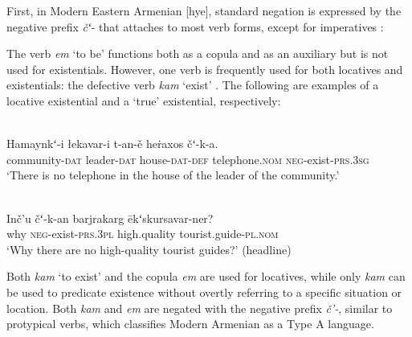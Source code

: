 \documentclass[output=paper,colorlinks,citecolor=brown]{langscibook}
\begin{document}
First, in Modern Eastern Armenian [hye], standard negation is
expressed by the negative prefix \textit{čʻ}- that attaches to most verb
forms, except for imperatives \parencite[522]{DumTragut2009}:
%
    \begin{exe}\end{exe}
%
The verb \textit{em} `to be' functions both as a copula and as an auxiliary
\parencite[215]{DumTragut2009} but is not used for existentials. However,
one verb is frequently used for both locatives and existentials: the
defective verb \textit{kam} `exist' \parencite[282]{DumTragut2009}. The following are examples of a locative existential and a `true' existential, respectively:
%
\begin{exe}
\ex
{}\\
    \gll Hamaynkʻ-i łekavar-i t-an-ě heṙaxos čʻ-k-a.  \\
community-\textsc{dat} leader-\textsc{dat} house-\textsc{dat-def}
telephone.\textsc{nom} \textsc{neg}-exist-\textsc{prs.3sg} \\
\glt `There is no telephone in the house of the leader of the community.' 

\ex
{}\\
    \gll Inč’u čʻ-k-an barjrakarg ēkʻskursavar-ner?  \\
why \textsc{neg}-exist-\textsc{prs.3pl} high.quality
tourist.guide-\textsc{pl.nom} \\
    \glt `Why there are no high-quality tourist guides?' (headline)
    \end{exe}
%
Both \textit{kam} `to exist' and the copula \textit{em} are used for locatives, while only \textit{kam} can be used to predicate existence without overtly referring to a specific situation or location. Both \textit{kam} and \textit{em} are negated with the negative prefix \textit{č’-}, similar to protypical verbs, which classifies Modern Armenian as a Type A language. 
\end{document}
